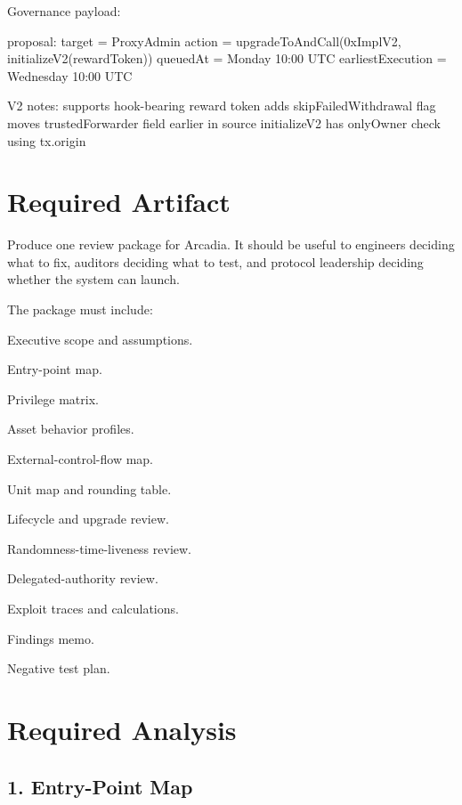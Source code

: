Governance payload:

\begin{codeblock}
proposal:
    target = ProxyAdmin
    action = upgradeToAndCall(0xImplV2, initializeV2(rewardToken))
    queuedAt = Monday 10:00 UTC
    earliestExecution = Wednesday 10:00 UTC

V2 notes:
    supports hook-bearing reward token
    adds skipFailedWithdrawal flag
    moves trustedForwarder field earlier in source
    initializeV2 has onlyOwner check using tx.origin
\end{codeblock}

\section*{Required Artifact}

\begin{artifactbox}
Produce one review package for Arcadia. It should be useful to engineers deciding what to fix, auditors deciding what to test, and protocol leadership deciding whether the system can launch.
\end{artifactbox}

The package must include:

\begin{artifactchecklist}
\item Executive scope and assumptions.
\item Entry-point map.
\item Privilege matrix.
\item Asset behavior profiles.
\item External-control-flow map.
\item Unit map and rounding table.
\item Lifecycle and upgrade review.
\item Randomness-time-liveness review.
\item Delegated-authority review.
\item Exploit traces and calculations.
\item Findings memo.
\item Negative test plan.
\end{artifactchecklist}

\section*{Required Analysis}

\subsection*{1. Entry-Point Map}

